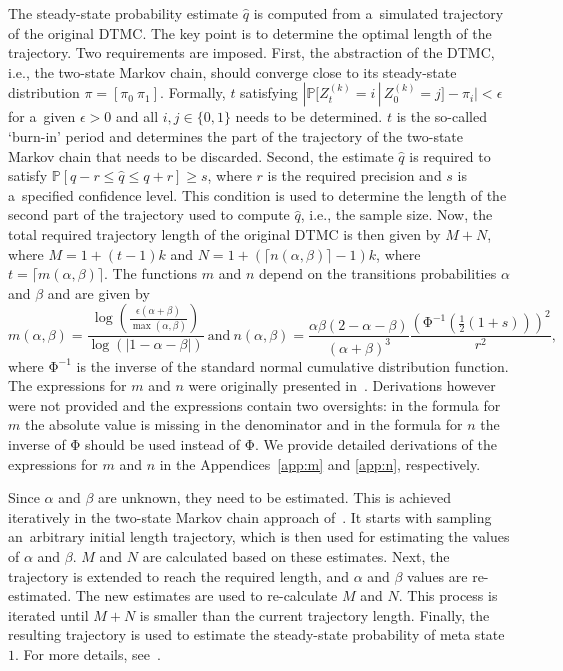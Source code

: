 \documentclass[runningheads,a4paper]{llncs}
\begin{document}
The steady-state probability estimate $\hat{q}$ is computed from a~simulated trajectory of the
original DTMC. The key point is to determine the optimal length of the trajectory. Two
requirements are imposed. First, the abstraction of the DTMC, i.e., the two-state Markov chain,
should converge close to its steady-state distribution $\pi = [\pi_0\ \pi_1]$. Formally, $t$
satisfying $|\mathbb{P}[Z_t^{(k)}=i\,|\,Z_0^{(k)}=j]-\pi_i|<\epsilon$ for a~given $\epsilon>0$ and
all $i,j \in \{0,1\}$ needs to be determined. $t$ is the so-called `burn-in' period and determines
the part of the trajectory of the two-state Markov chain that needs to be discarded. Second, the
estimate $\hat{q}$ is required to satisfy $\mathbb{P}[q-r\leqslant\hat{q}\leqslant q+r]\geqslant
s$, where $r$ is the required precision and $s$ is a~specified confidence level. This condition is
used to determine the length of the second part of the trajectory used to compute $\hat{q}$, i.e.,
the sample size. Now, the total required trajectory length of the original DTMC is then given by
$M+N$, where $M=1+(t-1)k$ and $N=1+(\lceil n(\alpha,\beta)\rceil - 1)k$, where $t=\lceil
m(\alpha,\beta)\rceil$. The functions $m$ and $n$ depend on the transitions probabilities $\alpha$
and $\beta$ and are given by
\begin{equation*}
m(\alpha,\beta)=\frac{\log{\left(\frac{\epsilon(\alpha+\beta)}{\max(\alpha,\beta)}\right)}}
{\log{(|1-\alpha-\beta|)}}
\ \textrm{and}\
n(\alpha,\beta)=\frac{\alpha\beta(2-\alpha-\beta)}{(\alpha+\beta)^3}
\frac{\left(\mathrm{\Phi}^{-1}(\frac{1}{2}(1+s))\right)^2}{r^2},
\end{equation*}
where $\mathrm{\Phi}^{-1}$ is the inverse of the standard normal cumulative distribution function.
The expressions for $m$ and $n$ were originally presented in~\cite{RL92}. Derivations however were
not provided and the expressions contain two oversights: in the formula for $m$ the absolute value
is missing in the denominator and in the formula for $n$ the inverse of $\mathrm{\Phi}$ should be
used instead of $\mathrm{\Phi}$. We provide detailed derivations of the expressions for $m$ and
$n$ in the Appendices~\ref{app:m} and \ref{app:n}, respectively.




Since $\alpha$ and $\beta$ are unknown, they need to be estimated. This is achieved iteratively in
the two-state Markov chain approach of~\cite{RL92}. It starts with sampling an~arbitrary initial
length trajectory, which is then used for estimating the values of $\alpha$ and $\beta$. $M$ and
$N$ are calculated based on these estimates. Next, the trajectory is extended to reach the
required length, and $\alpha$ and $\beta$ values are re-estimated. The new estimates are used to
re-calculate $M$ and $N$. This process is iterated until $M+N$ is smaller than the current
trajectory length. Finally, the resulting trajectory is used to estimate the steady-state
probability of meta state~$1$. For more details, see~\cite{RL92}.
\end{document}
